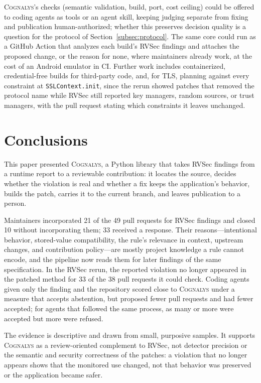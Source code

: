\documentclass[conference]{IEEEtran}
\newcommand{\system}{\textsc{Cognalys}}
\begin{document}
\system{}'s checks (semantic validation, build, port, cost ceiling) could be
offered to coding agents as tools or an agent skill, keeping judging separate
from fixing and publication human-authorized; whether this preserves decision
quality is a question for the protocol of Section~\ref{subsec:protocol}. The same core could run as a GitHub
Action that analyzes each build's RVSec findings and attaches the proposed
change, or the reason for none, where maintainers already work, at the cost of
an Android emulator in CI. Further work includes containerized, credential-free
builds for third-party code, and, for TLS, planning against every constraint
at \texttt{SSLContext.init}, since the rerun showed patches that removed
the protocol name while RVSec still reported key managers, random sources, or
trust managers, with the pull request stating which constraints it leaves
unchanged.

\section{Conclusions}
\label{sec:conclusion}

This paper presented \system{}, a Python library that takes RVSec findings from
a runtime report to a reviewable contribution: it locates the source, decides
whether the violation is real and whether a fix keeps the application's
behavior, builds the patch, carries it to the current branch, and leaves
publication to a person.

Maintainers incorporated 21 of the 49 pull requests for RVSec findings and closed 10 without
incorporating them; 33 received a response. Their reasons---intentional
behavior, stored-value compatibility, the rule's relevance in context,
upstream changes, and contribution policy---are mostly project knowledge a
rule cannot encode, and the pipeline now reads them for later findings of the
same specification. In the RVSec rerun, the reported violation no longer
appeared in the patched method for 33 of the 38 pull
requests it could check. Coding agents given only the finding and the
repository scored close to \system{} under a measure that accepts abstention,
but proposed fewer pull requests and had fewer accepted; for agents that
followed the same process, as many or more were accepted but more were refused.

The evidence is descriptive and drawn from small, purposive samples. It
supports \system{} as a review-oriented complement to RVSec, not detector
precision or the semantic and security correctness of the patches: a violation
that no longer appears shows that the monitored use changed, not that behavior
was preserved or the application became safer.
\end{document}
